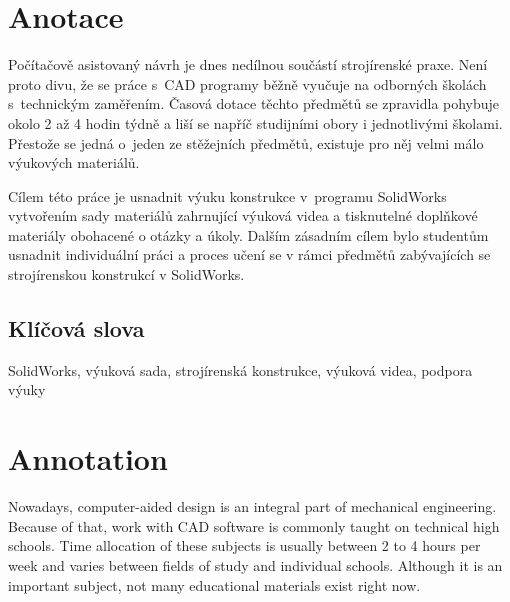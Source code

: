 \documentclass{template/socthesis}
\author{Petr Štourač}
\begin{document}

\maketitle



\makethanks{\B{\textcolor{red}{PŠ: Poděkování sepísnu na závěr.}}}

\pagestyle{empty}

\section*{Anotace}
Počítačově asistovaný návrh je dnes nedílnou součástí strojírenské praxe.
Není proto divu, že se práce s~CAD programy běžně vyučuje na odborných školách s~technickým zaměřením.
Časová dotace těchto předmětů se zpravidla pohybuje okolo 2 až 4 hodin týdně a liší se napříč studijními obory i jednotlivými školami.
Přestože se jedná o~jeden ze stěžejních předmětů, existuje pro něj velmi málo výukových materiálů.

Cílem této práce je usnadnit výuku konstrukce v~programu SolidWorks vytvořením sady materiálů zahrnující výuková videa a tisknutelné doplňkové materiály obohacené o otázky a úkoly.
Dalším zásadním cílem bylo studentům usnadnit individuální práci a proces učení se v rámci předmětů zabývajících se strojírenskou konstrukcí v SolidWorks. 

\subsection*{Klíčová slova}
SolidWorks, výuková sada, strojírenská konstrukce, výuková videa, podpora výuky

\vspace{20mm}

\section*{Annotation}
Nowadays, computer-aided design is an integral part of mechanical engineering.
Because of that, work with CAD software is commonly taught on technical high schools.
Time allocation of these subjects is usually between 2 to 4 hours per week and varies between fields of study and individual schools. 
Although it is an important subject, not many educational materials exist right now.
\end{document}
